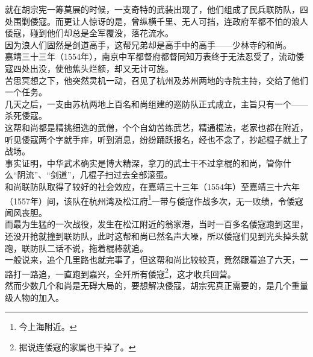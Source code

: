\begin{multicols}{\theparacolNo}
就在胡宗宪一筹莫展的时候，一支奇特的武装出现了，他们组成了民兵联防队，四处围剿倭寇。而更让人惊讶的是，曾纵横千里、无人可挡，连政府军都不怕的浪人倭寇，碰到他们却总是全军覆没，落花流水。\\

因为浪人们固然是剑道高手，这帮兄弟却是高手中的高手——少林寺的和尚。\\

嘉靖三十三年（1554年），南京中军都督府都督同知万表终于无法忍受了，流动倭寇四处出没，使他焦头烂额，却又无计可施。\\

苦思冥想之下，他突然灵机一动，召见了杭州及苏州两地的寺院主持，交给了他们一个任务。\\

几天之后，一支由苏杭两地上百名和尚组建的巡防队正式成立，主旨只有一个——杀死倭寇。\\

这帮和尚都是精挑细选的武僧，个个自幼苦练武艺，精通棍法，老家也都在附近，听见倭寇两个字就手痒，听到消息，纷纷踊跃报名，经也不念了，抄起棍子就上了战场。\\

事实证明，中华武术确实是博大精深，拿刀的武士干不过拿棍的和尚，管你什么“阴流”、“剑道”，几棍子扫过去全部滚蛋。\\

和尚联防队取得了较好的社会效应，在嘉靖三十三年（1554年）至嘉靖三十六年（1557年）间，该队在杭州湾及松江府\footnote{今上海附近。}一带与倭寇作战多次，无一败绩，令倭寇闻风丧胆。\\

而最为生猛的一次战役，发生在松江附近的翁家港，当时一百多名倭寇跑到这里，还没开抢就撞到联防队，此时这帮和尚已然名声大噪，所以倭寇们见到光头掉头就跑，联防队二话不说，拖着棍棒就追。\\

一般说来，追个几里路也就完事了，但这帮和尚比较较真，竟然跟着追了六天，一路打一路追，一直跑到嘉兴，全歼所有倭寇\footnote{据说连倭寇的家属也干掉了。}，这才收兵回营。\\

然而少数几个和尚是无碍大局的，要想解决倭寇，胡宗宪真正需要的，是几个重量级人物的加入。\\
\ifnum{}
	\end{multicols}
\fi
\newpage
